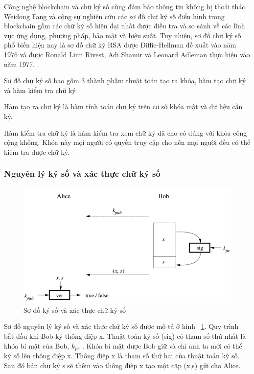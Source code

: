 Công nghệ blockchain và chữ ký số cùng đảm bảo thông tin không bị thoái thác. Weidong Fang và cộng sự \cite{Fang2020} nghiên cứu các sơ đồ chữ ký số điển hình trong blockchain gồm các chữ ký số hiện đại nhất được điều tra và so sánh về các lĩnh vực ứng dụng, phương pháp, bảo mật và hiệu suất.
Tuy nhiên, sơ đồ chữ ký số phổ biến hiện nay là sơ đồ chữ ký RSA được Diffie-Hellman đề xuất vào năm 1976 và được Ronald Linn Rivest, Adi Shamir và Leonard Adleman thực hiện vào năm 1977. \cite{10.5555/1721909}. 

Sơ đồ chữ ký số bao gồm 3 thành phần: thuật toán tạo ra khóa, hàm tạo chữ ký và hàm kiểm tra chữ ký.

Hàm tạo ra chữ ký là hàm tính toán chữ ký trên cơ sở khóa mật và dữ liệu cần ký.

Hàm kiểm tra chữ ký là hàm kiểm tra xem chữ ký đã cho có đúng với khóa công cộng không. Khóa này mọi người có quyền truy cập cho nên mọi người đều có thể kiểm tra được chữ ký.

\subsubsection{Nguyên lý ký số và xác thực chữ ký số }

\begin{figure}[htbp]
\centering
\includegraphics[width=.9\linewidth]{img/dig_sig.png}
\caption{Sơ đồ ký số và xác thực chữ ký số}
\label{fig:dig_sig}
\end{figure}
Sơ đồ nguyên lý ký số và xác thực chữ ký số\cite{10.5555/1721909} được mô tả ở hình ~\ref{fig:dig_sig}.
Quy trình bắt đầu khi Bob ký thông điệp x. Thuật toán ký số (sig) có tham số thứ nhất là khóa bí mật của Bob, $k_{pr}$ . Khóa bí mật được Bob giữ và chỉ anh ta mới có thể ký số lên thông điệp x. Thông điệp x là tham số thứ hai của thuật toán ký số. Sau đó bản chữ ký s sẽ thêm vào thông điêp x tạo một cặp (x,s) gửi cho Alice.
 
